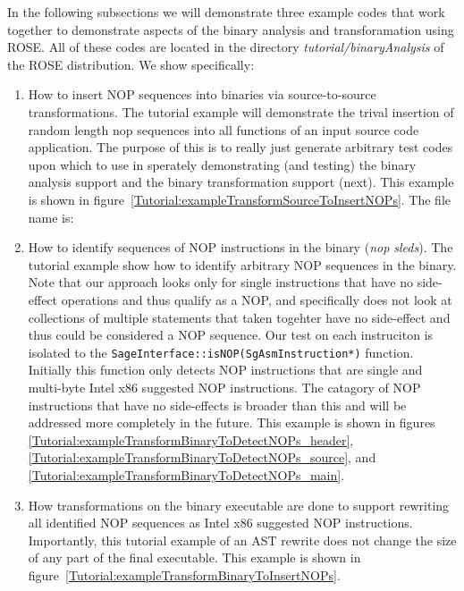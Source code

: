 In the following subsections we will demonstrate three example codes that
work together to demonstrate aspects of the binary analysis and transforamation using
ROSE.  All of these codes are located in the directory {\em tutorial/binaryAnalysis}
of the ROSE distribution. We show specifically:
\begin{enumerate}
   \item How to insert NOP sequences into binaries via source-to-source transformations.
         The tutorial example will demonstrate the trival insertion of random length
         nop sequences into all functions of an input source code application.
         The purpose of this is to really just generate arbitrary test codes
         upon which to use in sperately demonstrating (and testing) the binary analysis 
         support and the binary transformation support (next).  This example is
         shown in figure~\ref{Tutorial:exampleTransformSourceToInsertNOPs}.
         The file name is: 
   \item How to identify sequences of NOP instructions in the binary ({\em nop sleds}).
         The tutorial example show how to identify arbitrary NOP sequences in the 
         binary.  Note that our approach looks only for single instructions that have
         no side-effect operations and thus qualify as a NOP, and specifically does not
         look at collections of multiple statements that taken togehter have no
         side-effect and thus could be considered a NOP sequence. Our test on each 
         instruciton is isolated to the {\tt SageInterface::isNOP(SgAsmInstruction*)} 
         function.  Initially this function only detects NOP instructions that are
         single and multi-byte Intel x86 suggested NOP instructions.  The catagory of
         NOP instructions that have no side-effects is broader than this and will
         be addressed more completely in the future. This example is
         shown in figures \ref{Tutorial:exampleTransformBinaryToDetectNOPs_header},
         \ref{Tutorial:exampleTransformBinaryToDetectNOPs_source}, and
         \ref{Tutorial:exampleTransformBinaryToDetectNOPs_main}.
   \item How transformations on the binary executable are done to support rewriting
         all identified NOP sequences as Intel x86 suggested NOP instructions.
         Importantly, this tutorial example of an AST rewrite does not change the 
         size of any part of the final executable. This example is
         shown in figure~\ref{Tutorial:exampleTransformBinaryToInsertNOPs}.
\end{enumerate}

